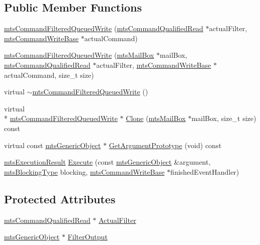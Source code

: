 \subsection*{Public Member Functions}
\begin{DoxyCompactItemize}
\item 
\hyperlink{classmts_command_filtered_queued_write_ab01016fda86f12a553c5b7cb96598d67}{mts\-Command\-Filtered\-Queued\-Write} (\hyperlink{classmts_command_qualified_read}{mts\-Command\-Qualified\-Read} $\ast$actual\-Filter, \hyperlink{classmts_command_write_base}{mts\-Command\-Write\-Base} $\ast$actual\-Command)
\item 
\hyperlink{classmts_command_filtered_queued_write_a0eb986c33def2704bf514fa4b9868ef1}{mts\-Command\-Filtered\-Queued\-Write} (\hyperlink{classmts_mail_box}{mts\-Mail\-Box} $\ast$mail\-Box, \hyperlink{classmts_command_qualified_read}{mts\-Command\-Qualified\-Read} $\ast$actual\-Filter, \hyperlink{classmts_command_write_base}{mts\-Command\-Write\-Base} $\ast$actual\-Command, size\-\_\-t size)
\item 
virtual \hyperlink{classmts_command_filtered_queued_write_a94068246efae390821532312462eda7b}{$\sim$mts\-Command\-Filtered\-Queued\-Write} ()
\item 
virtual \\*
\hyperlink{classmts_command_filtered_queued_write}{mts\-Command\-Filtered\-Queued\-Write} $\ast$ \hyperlink{classmts_command_filtered_queued_write_a43b5f03075b7403afec8db6afb7c1e0d}{Clone} (\hyperlink{classmts_mail_box}{mts\-Mail\-Box} $\ast$mail\-Box, size\-\_\-t size) const 
\item 
virtual const \hyperlink{classmts_generic_object}{mts\-Generic\-Object} $\ast$ \hyperlink{classmts_command_filtered_queued_write_a576ba5d70031bcbc36b8243c8c1ee0b3}{Get\-Argument\-Prototype} (void) const 
\item 
\hyperlink{classmts_execution_result}{mts\-Execution\-Result} \hyperlink{classmts_command_filtered_queued_write_aff8888085a9797ea557a097f07dd742b}{Execute} (const \hyperlink{classmts_generic_object}{mts\-Generic\-Object} \&argument, \hyperlink{mts_forward_declarations_8h_ad7426ccb6c883bc780d0ee197dddcbe7}{mts\-Blocking\-Type} blocking, \hyperlink{classmts_command_write_base}{mts\-Command\-Write\-Base} $\ast$finished\-Event\-Handler)
\end{DoxyCompactItemize}
\subsection*{Protected Attributes}
\begin{DoxyCompactItemize}
\item 
\hyperlink{classmts_command_qualified_read}{mts\-Command\-Qualified\-Read} $\ast$ \hyperlink{classmts_command_filtered_queued_write_a718a512e857afbb05d1b4ab6886b57f5}{Actual\-Filter}
\item 
\hyperlink{classmts_generic_object}{mts\-Generic\-Object} $\ast$ \hyperlink{classmts_command_filtered_queued_write_a485105f94a78b6a6ef600c3dbf9140d0}{Filter\-Output}
\end{DoxyCompactItemize}
